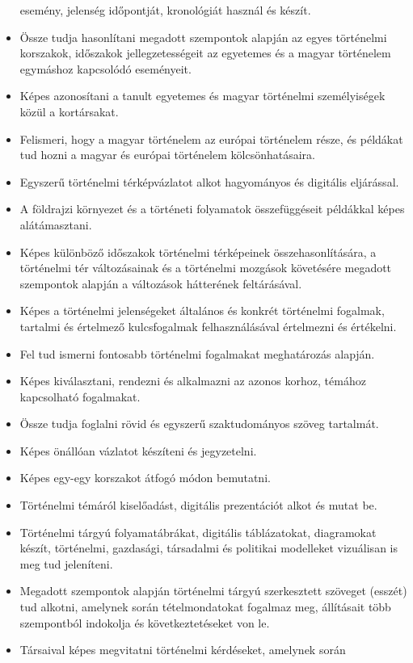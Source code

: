 \begin{itemize}
  esemény, jelenség időpontját, kronológiát használ és készít.
\item
  Össze tudja hasonlítani megadott szempontok alapján az egyes
  történelmi korszakok, időszakok jellegzetességeit az egyetemes és a
  magyar történelem egymáshoz kapcsolódó eseményeit.
\item
  Képes azonosítani a tanult egyetemes és magyar történelmi
  személyiségek közül a kortársakat.
\item
  Felismeri, hogy a magyar történelem az európai történelem része, és
  példákat tud hozni a magyar és európai történelem kölcsönhatásaira.
\item
  Egyszerű történelmi térképvázlatot alkot hagyományos és digitális
  eljárással.
\item
  A földrajzi környezet és a történeti folyamatok összefüggéseit
  példákkal képes alátámasztani.
\item
  Képes különböző időszakok történelmi térképeinek összehasonlítására, a
  történelmi tér változásainak és a történelmi mozgások követésére
  megadott szempontok alapján a változások hátterének feltárásával.
\item
  Képes a történelmi jelenségeket általános és konkrét történelmi
  fogalmak, tartalmi és értelmező kulcsfogalmak felhasználásával
  értelmezni és értékelni.
\item
  Fel tud ismerni fontosabb történelmi fogalmakat meghatározás alapján.
\item
  Képes kiválasztani, rendezni és alkalmazni az azonos korhoz, témához
  kapcsolható fogalmakat.
\item
  Össze tudja foglalni rövid és egyszerű szaktudományos szöveg
  tartalmát.
\item
  Képes önállóan vázlatot készíteni és jegyzetelni.
\item
  Képes egy-egy korszakot átfogó módon bemutatni.
\item
  Történelmi témáról kiselőadást, digitális prezentációt alkot és mutat
  be.
\item
  Történelmi tárgyú folyamatábrákat, digitális táblázatokat, diagramokat
  készít, történelmi, gazdasági, társadalmi és politikai modelleket
  vizuálisan is meg tud jeleníteni.
\item
  Megadott szempontok alapján történelmi tárgyú szerkesztett szöveget
  (esszét) tud alkotni, amelynek során tételmondatokat fogalmaz meg,
  állításait több szempontból indokolja és következtetéseket von le.
\item
  Társaival képes megvitatni történelmi kérdéseket, amelynek során

\end{itemize}
